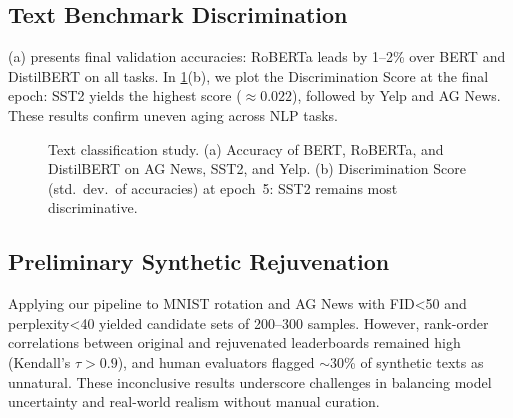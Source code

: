 \documentclass{article} %
\begin{document}
\subsection{Text Benchmark Discrimination}
(a) presents final validation accuracies: RoBERTa leads by 1–2\% over BERT and DistilBERT on all tasks. In \cref{fig:text_accuracy}(b), we plot the Discrimination Score at the final epoch: SST2 yields the highest score ($\approx0.022$), followed by Yelp and AG News. These results confirm uneven aging across NLP tasks.

\begin{figure}[t]
  \centering
  \quad
  \caption{Text classification study. (a) Accuracy of BERT, RoBERTa, and DistilBERT on AG News, SST2, and Yelp. (b) Discrimination Score (std.\ dev.\ of accuracies) at epoch~5: SST2 remains most discriminative.}
  \label{fig:text_accuracy}
\end{figure}

\subsection{Preliminary Synthetic Rejuvenation}
Applying our pipeline to MNIST rotation and AG News with FID<50 and perplexity<40 yielded candidate sets of 200–300 samples. However, rank-order correlations between original and rejuvenated leaderboards remained high (Kendall's $\tau>0.9$), and human evaluators flagged $\sim$30\% of synthetic texts as unnatural. These inconclusive results underscore challenges in balancing model uncertainty and real-world realism without manual curation.
\end{document}
